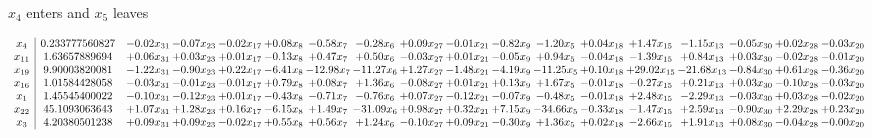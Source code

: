 \documentclass[9pt]{article}
\begin{document}
 $ x_{4} $ enters and $ x_{5} $ leaves 

 \[\begin{array}{c| c c@{\hskip 2pt} c@{\hskip 2pt} c@{\hskip 2pt} c@{\hskip 2pt} c@{\hskip 2pt} c@{\hskip 2pt} c@{\hskip 2pt} c@{\hskip 2pt} c@{\hskip 2pt} c@{\hskip 2pt} c@{\hskip 2pt} c@{\hskip 2pt} c@{\hskip 2pt} c@{\hskip 2pt} c@{\hskip 2pt} c@{\hskip 2pt} }
 x_{4}   &  0.233777560827 & -0.02 x_{31} & -0.07 x_{23} & -0.02 x_{17} & +  0.08 x_{8} & -0.58 x_{7} & -0.28 x_{6} & +  0.09 x_{27} & -0.01 x_{21} & -0.82 x_{9} & -1.20 x_{5} & +  0.04 x_{18} & +  1.47 x_{15} & -1.15 x_{13} & -0.05 x_{30} & +  0.02 x_{28} & -0.03 x_{20}\\
 x_{11}   &  1.63657889694 & +  0.06 x_{31} & +  0.03 x_{23} & +  0.01 x_{17} & -0.13 x_{8} & +  0.47 x_{7} & +  0.50 x_{6} & -0.03 x_{27} & +  0.01 x_{21} & -0.05 x_{9} & +  0.94 x_{5} & -0.04 x_{18} & -1.39 x_{15} & +  0.84 x_{13} & +  0.03 x_{30} & -0.02 x_{28} & -0.01 x_{20}\\
 x_{19}   &  9.90003820081 & -1.22 x_{31} & -0.90 x_{23} & +  0.22 x_{17} & -6.41 x_{8} & -12.98 x_{7} & -11.27 x_{6} & +  1.27 x_{27} & -1.48 x_{21} & -4.19 x_{9} & -11.25 x_{5} & +  0.10 x_{18} & + 29.02 x_{15} & -21.68 x_{13} & -0.84 x_{30} & +  0.61 x_{28} & -0.36 x_{20}\\
 x_{16}   &  1.01584428058 & -0.03 x_{31} & -0.01 x_{23} & -0.01 x_{17} & +  0.79 x_{8} & +  0.08 x_{7} & +  1.36 x_{6} & -0.08 x_{27} & +  0.01 x_{21} & +  0.13 x_{9} & +  1.67 x_{5} & -0.01 x_{18} & -0.27 x_{15} & +  0.21 x_{13} & +  0.03 x_{30} & -0.10 x_{28} & -0.03 x_{20}\\
 x_{1}   &  1.45545400022 & -0.10 x_{31} & -0.12 x_{23} & +  0.01 x_{17} & -0.43 x_{8} & -0.71 x_{7} & -0.76 x_{6} & +  0.07 x_{27} & -0.12 x_{21} & -0.07 x_{9} & -0.48 x_{5} & -0.01 x_{18} & +  2.48 x_{15} & -2.29 x_{13} & -0.03 x_{30} & +  0.03 x_{28} & -0.02 x_{20}\\
 x_{22}   &  45.1093063643 & +  1.07 x_{31} & +  1.28 x_{23} & +  0.16 x_{17} & -6.15 x_{8} & +  1.49 x_{7} & -31.09 x_{6} & +  0.98 x_{27} & +  0.32 x_{21} & +  7.15 x_{9} & -34.66 x_{5} & -0.33 x_{18} & -1.47 x_{15} & +  2.59 x_{13} & -0.90 x_{30} & +  2.29 x_{28} & +  0.23 x_{20}\\
 x_{3}   &  4.20380501238 & +  0.09 x_{31} & +  0.09 x_{23} & -0.02 x_{17} & +  0.55 x_{8} & +  0.56 x_{7} & +  1.24 x_{6} & -0.10 x_{27} & +  0.09 x_{21} & -0.30 x_{9} & +  1.36 x_{5} & +  0.02 x_{18} & -2.66 x_{15} & +  1.91 x_{13} & +  0.08 x_{30} & -0.04 x_{28} & -0.00 x_{20}\\

\end{array}\]
\end{document}
